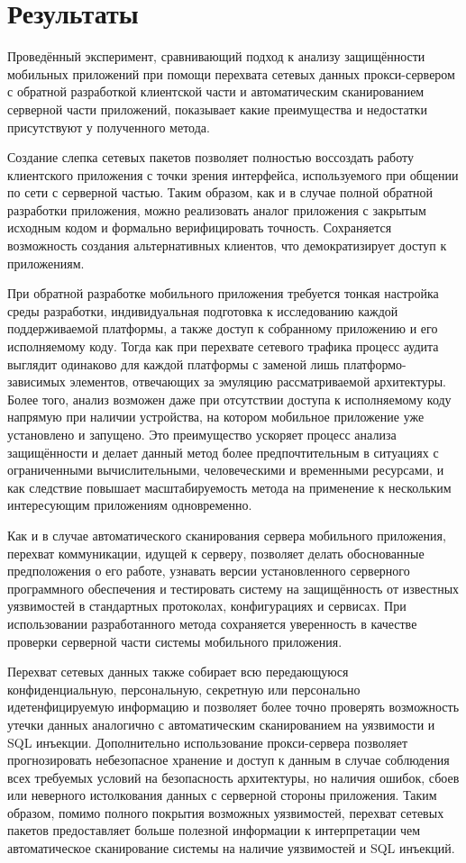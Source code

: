 \section{Результаты}

Проведённый эксперимент, сравнивающий подход к анализу защищённости мобильных приложений при помощи перехвата сетевых данных прокси-сервером с обратной разработкой клиентской части и автоматическим сканированием серверной части приложений, показывает какие преимущества и недостатки присутствуют у полученного метода.

Создание слепка сетевых пакетов позволяет полностью воссоздать работу клиентского приложения с точки зрения интерфейса, используемого при общении по сети с серверной частью. Таким образом, как и в случае полной обратной разработки приложения, можно реализовать аналог приложения с закрытым исходным кодом и формально верифицировать точность. Сохраняется возможность создания альтернативных клиентов, что демократизирует доступ к приложениям.

При обратной разработке мобильного приложения требуется тонкая настройка среды разработки, индивидуальная подготовка к исследованию каждой поддерживаемой платформы, а также доступ к собранному приложению и его исполняемому коду. Тогда как при перехвате сетевого трафика процесс аудита выглядит одинаково для каждой платформы с заменой лишь платформо-зависимых элементов, отвечающих за эмуляцию рассматриваемой архитектуры. Более того, анализ возможен даже при отсутствии доступа к исполняемому коду напрямую при наличии устройства, на котором мобильное приложение уже установлено и запущено. Это преимущество ускоряет процесс анализа защищённости и делает данный метод более предпочтительным в ситуациях с ограниченными вычислительными, человеческими и временными ресурсами, и как следствие повышает масштабируемость метода на применение к нескольким интересующим приложениям одновременно.

Как и в случае автоматического сканирования сервера мобильного приложения, перехват коммуникации, идущей к серверу, позволяет делать обоснованные предположения о его работе, узнавать версии установленного серверного программного обеспечения и тестировать систему на защищённость от известных уязвимостей в стандартных протоколах, конфигурациях и сервисах. При использовании разработанного метода сохраняется уверенность в качестве проверки серверной части системы мобильного приложения.

Перехват сетевых данных также собирает всю передающуюся конфиденциальную, персональную, секретную или персонально идетенфицируемую информацию и позволяет более точно проверять возможность утечки данных аналогично с автоматическим сканированием на уязвимости и SQL инъекции. Дополнительно использование прокси-сервера позволяет прогнозировать небезопасное хранение и доступ к данным в случае соблюдения всех требуемых условий на безопасность архитектуры, но наличия ошибок, сбоев или неверного истолкования данных с серверной стороны приложения. Таким образом, помимо полного покрытия возможных уязвимостей, перехват сетевых пакетов предоставляет больше полезной информации к интерпретации чем автоматическое сканирование системы на наличие уязвимостей и SQL инъекций.

